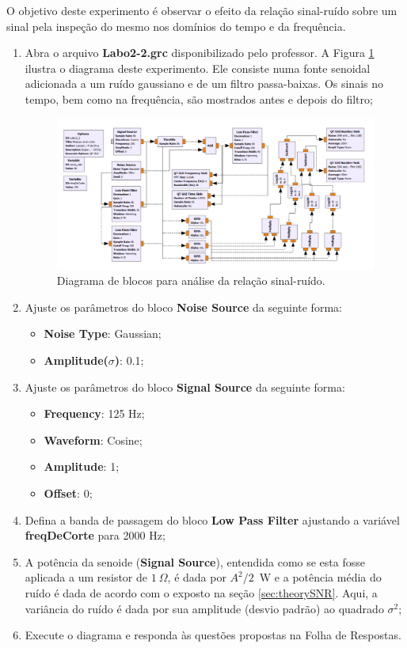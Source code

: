 \documentclass[12pt,addpoints]{exam}
\begin{document}
O objetivo deste experimento é observar o efeito da relação sinal-ruído sobre um sinal pela inspeção do mesmo nos domínios do tempo e da frequência.

\begin{enumerate}
    \item Abra o arquivo \textbf{Labo2-2.grc} disponibilizado pelo professor. A Figura \ref{fig:GRC_2-2a} ilustra o diagrama deste experimento. Ele consiste numa fonte senoidal adicionada a um ruído gaussiano e de um filtro passa-baixas. Os sinais no tempo, bem como na frequência, são mostrados antes e depois do filtro;
    \begin{figure}[htb]
        \centering
        \includegraphics[width=1.0\linewidth]{./Figuras/GRC_2-2}
        \caption{Diagrama de blocos para análise da relação sinal-ruído.} 
        \label{fig:GRC_2-2a}
    \end{figure}
    \item Ajuste os parâmetros do bloco \textbf{Noise Source} da seguinte forma:
    \begin{itemize}
        \item \textbf{Noise Type}: Gaussian;
        \item \textbf{Amplitude($\sigma$)}: 0.1;
    \end{itemize}
    \item Ajuste os parâmetros do bloco \textbf{Signal Source} da seguinte forma:
    \begin{itemize}
        \item \textbf{Frequency}: 125 Hz;
        \item \textbf{Waveform}: Cosine;
        \item \textbf{Amplitude}: 1;
        \item \textbf{Offset}: 0;
    \end{itemize}
    \item Defina a banda de passagem do bloco \textbf{Low Pass Filter} ajustando a variável \textbf{freqDeCorte} para 2000 Hz;
    \item A potência da senoide (\textbf{Signal Source}), entendida como se esta fosse aplicada a um resistor de $1~\Omega$, é dada por $A^2/2$~W e a potência média do ruído é dada de acordo com o exposto na seção \ref{sec:theorySNR}. Aqui, a variância do ruído é dada por sua amplitude (desvio padrão) ao quadrado $\sigma^2$;
    \item Execute o diagrama e responda às questões propostas na Folha de Respostas.
\end{enumerate}
\end{document}
